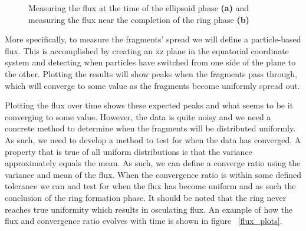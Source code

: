 \documentclass[a4paper, 12pt]{article}
\begin{document}
\begin{figure}[h]
	\begin{adjustbox}{max width=1\linewidth,center}
		\centering     %
	\end{adjustbox}
	\caption{Measuring the flux at the time of the ellipsoid phase \textbf{(a)} and measuring the flux near the completion of the ring phase \textbf{(b)} }
	\label{flux_diagrams}
\end{figure}

More specifically, to measure the fragments' spread we will define a particle-based flux. This is accomplished by creating an xz plane in the equatorial coordinate system and detecting when particles have switched from one side of the plane to the other. Plotting the results will show peaks when the fragments pass through, which will converge to some value as the fragments become uniformly spread out.

Plotting the flux over time shows these expected peaks and what seems to be it converging to some value. However, the data is quite noisy and we need a concrete method to determine when the fragments will be distributed uniformly. As such, we need to develop a method to test for when the data has converged.
A property that is true of all uniform distributions is that the variance approximately equals the mean. As such, we can define a converge ratio using the variance and mean of the flux. When the convergence ratio is within some defined tolerance we can and test for when the flux has become uniform and as such the conclusion of the ring formation phase. It should be noted that the ring never reaches true uniformity which results in osculating flux. An example of how the flux and convergence ratio evolves with time is shown in figure ~\ref{flux_plots}.
\end{document}
